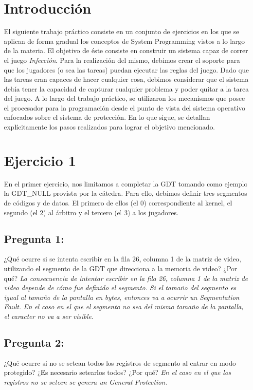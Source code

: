 \documentclass[10pt, a4paper]{article}
\begin{document}
\section{Introducci\'on}
El siguiente trabajo práctico consiste en un conjunto de ejercicios en los que se aplican de forma gradual los conceptos de System Programming vistos a lo largo de la materia. El objetivo de éste consiste en construir un sistema capaz de correr el juego \textit{Infección}. Para la realización del mismo, debimos crear el soporte para que los jugadores (o sea las tareas) puedan ejecutar las reglas del juego. Dado que las tareas eran capaces de hacer cualquier cosa, debimos considerar que el sistema debía tener la capacidad de capturar cualquier problema y poder quitar a la tarea del juego.\newline
A lo largo del trabajo práctico, se utilizaron los mecanismos que posee el procesador para la programación desde el punto de vista del sistema operativo enfocados sobre el sistema de protección. En lo que sigue, se detallan explícitamente los pasos realizados para lograr el objetivo mencionado.

\section{Ejercicio 1}

En el primer ejercicio, nos limitamos a completar la GDT tomando como ejemplo la GDT\_NULL provista por la cátedra. Para ello, debimos definir tres segmentos de códigos y de datos. El primero de ellos (el 0) correspondiente al kernel, el segundo (el 2) al árbitro y el tercero (el 3) a los jugadores.\newline
\newline
{\subsection{Pregunta 1:}} ¿Qué ocurre si se intenta escribir en la fila 26, columna 1 de la matriz de video, utilizando el segmento de la GDT que direcciona a la memoria de video? ¿Por qué?\newline
\newline
\textit{La consecuencia de intentar escribir en la fila 26, columna 1 de la matriz de video depende de cómo fue definido el segmento. Si el tamaño del segmento es igual al tamaño de la pantalla en bytes, entonces va a ocurrir un Segmentation Fault. En el caso en el que el segmento no sea del mismo tamaño de la pantalla, el caracter no va a ser visible.}\newline
\newline
{\subsection{Pregunta 2:}} ¿Qué ocurre si no se setean todos los registros de segmento al entrar en modo protegido? ¿Es necesario setearlos todos? ¿Por qué?\newline
\textit{En el caso en el que los registros no se seteen se genera un General Protection.}
\end{document}
